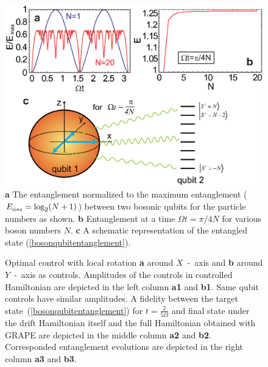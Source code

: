 \documentclass[
aps,%
12pt,%
final,%
notitlepage,%
oneside,%
onecolumn,%
nobibnotes,%
nofootinbib,%
superscriptaddress,%
noshowpacs,%
centertags]%
{revtex4}
\begin{document}
\begin{figure}[t!]
\setcaptionmargin{5mm}
\onelinecaptionsfalse
\begin{center}
    \includegraphics[width=13cm]{fig1.eps}
\end{center}
\caption{
    {\bf a} The entanglement normalized to the maximum entanglement ($E_{\mbox{\tiny max}} = \log_2 (N+1) $) between two bosonic qubits for the particle numbers as shown.
    {\bf b} Entanglement at a time $ \Omega t= \pi/4N $ for various boson numbers $ N $.
    {\bf c} A schematic representation of the entangled state (\ref{bosonqubitentanglement}).
}
\label{fig1:entanglement}
\end{figure}

\newpage

\begin{figure}[t!]
\setcaptionmargin{5mm}
\onelinecaptionsfalse
{}
\caption{
    Optimal control with local rotation {\bf a} around $X$~-~axis and {\bf b} around $Y$~-~axis as controls. Amplitudes of the controls in controlled Hamiltonian are depicted in the left column {\bf a1} and {\bf b1}. Same qubit controls have similar amplitudes. A fidelity between the target state~(\ref{bosonqubitentanglement}) for $t=\frac{2}{5\Omega}$ and final state under the drift Hamiltonian itself and the full Hamiltonian obtained with GRAPE are depicted in the middle column {\bf a2} and {\bf b2}. Corresponded entanglement evolutions are depicted in the right column {\bf a3} and {\bf b3}.
}
\label{fig2:rotation}
\end{figure}
\end{document}
